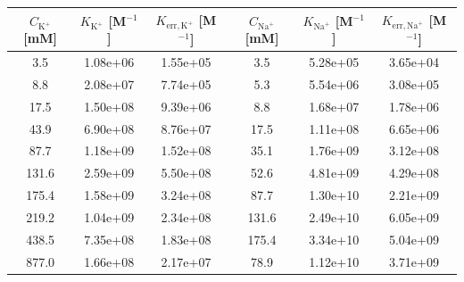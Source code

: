 \begin{tabular}{cccccc}
\toprule
$C_{\mathrm{K}^+}$ [mM] & $K_{\mathrm{K}^+}$ [M$^{-1}$] & $K_{\mathrm{err,K}^+}$ [M$^{-1}$] & $C_{\mathrm{Na}^+}$ [mM] & $K_{\mathrm{Na}^+}$ [M$^{-1}$] & $K_{\mathrm{err,Na}^+}$ [M$^{-1}$] \\
\midrule
3.5 & 1.08e+06 & 1.55e+05 & 3.5 & 5.28e+05 & 3.65e+04 \\
8.8 & 2.08e+07 & 7.74e+05 & 5.3 & 5.54e+06 & 3.08e+05 \\
17.5 & 1.50e+08 & 9.39e+06 & 8.8 & 1.68e+07 & 1.78e+06 \\
43.9 & 6.90e+08 & 8.76e+07 & 17.5 & 1.11e+08 & 6.65e+06 \\
87.7 & 1.18e+09 & 1.52e+08 & 35.1 & 1.76e+09 & 3.12e+08 \\
131.6 & 2.59e+09 & 5.50e+08 & 52.6 & 4.81e+09 & 4.29e+08 \\
175.4 & 1.58e+09 & 3.24e+08 & 87.7 & 1.30e+10 & 2.21e+09 \\
219.2 & 1.04e+09 & 2.34e+08 & 131.6 & 2.49e+10 & 6.05e+09 \\
438.5 & 7.35e+08 & 1.83e+08 & 175.4 & 3.34e+10 & 5.04e+09 \\
877.0 & 1.66e+08 & 2.17e+07 & 78.9 & 1.12e+10 & 3.71e+09 \\
\bottomrule
\end{tabular}
